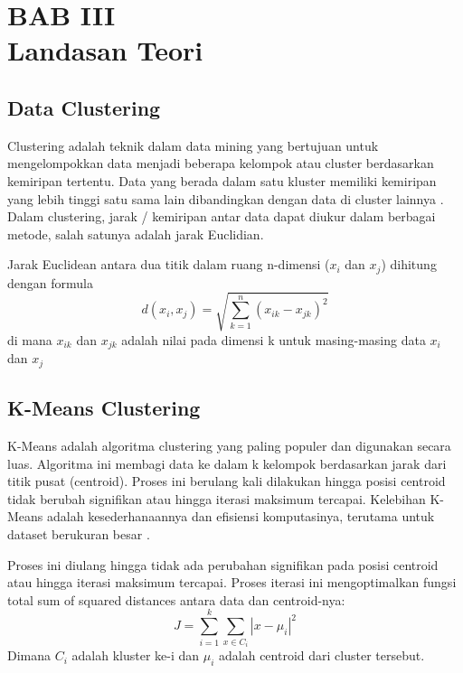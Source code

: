 \section*{\centering BAB III \\ Landasan Teori}


\setcounter{section}{3}
\setcounter{subsection}{0}  %
\setcounter{figure}{0}
\renewcommand{\thefigure}{\thesection.\arabic{figure}}

\subsection{Data Clustering}
Clustering adalah teknik dalam data mining yang bertujuan untuk mengelompokkan data menjadi beberapa kelompok atau cluster berdasarkan kemiripan tertentu. Data yang berada dalam satu kluster memiliki kemiripan yang lebih tinggi satu sama lain dibandingkan dengan data di cluster lainnya \cite{DataClusteringAKJein}. Dalam clustering, jarak / kemiripan antar data dapat diukur dalam berbagai metode, salah satunya adalah jarak Euclidian.

Jarak Euclidean antara dua titik dalam ruang n-dimensi ($x_i$ dan $x_j$) dihitung dengan formula
\[
d(x_i, x_j) = \sqrt{\sum_{k=1}^{n} (x_{ik} - x_{jk})^2}
\]
di mana $x_{ik}$ dan $x_{jk}$ adalah nilai pada dimensi k untuk masing-masing data $x_i$ dan $x_j$
 
\subsection{K-Means Clustering}
K-Means adalah algoritma clustering yang paling populer dan digunakan secara luas. Algoritma ini membagi data ke dalam k kelompok berdasarkan jarak dari titik pusat (centroid). Proses ini berulang kali dilakukan hingga posisi centroid tidak berubah signifikan atau hingga iterasi maksimum tercapai. Kelebihan K-Means adalah kesederhanaannya dan efisiensi komputasinya, terutama untuk dataset berukuran besar \cite{KMeansDef}. 

Proses ini diulang hingga tidak ada perubahan signifikan pada posisi centroid atau hingga iterasi maksimum tercapai. Proses iterasi ini mengoptimalkan fungsi total sum of squared distances antara data dan centroid-nya:
\[
J = \sum_{i=1}^k \sum_{x\in C_i} |x - \mu_i|^2
\]
Dimana $C_i$ adalah kluster ke-i dan $\mu_i$ adalah centroid dari cluster tersebut.

